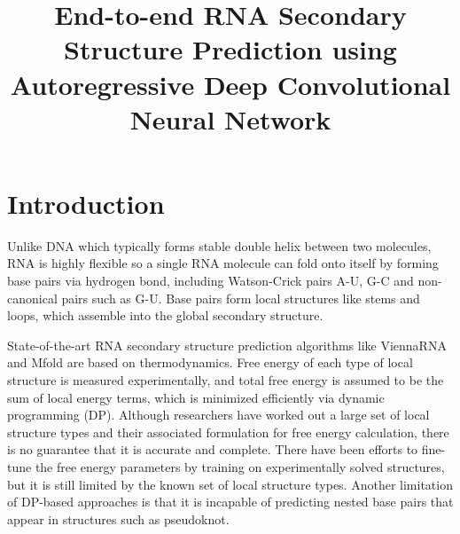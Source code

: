 \documentclass{article}
\title{End-to-end RNA Secondary Structure Prediction using Autoregressive Deep Convolutional Neural Network}
\begin{document}
\maketitle


\vspace*{-7em}

\section{Introduction}

Unlike DNA which typically forms stable double helix between two molecules, RNA is highly flexible
so a single RNA molecule can fold onto itself by
forming base pairs via hydrogen bond, including Watson-Crick pairs A-U,
G-C and non-canonical pairs such as G-U.
Base pairs form local structures like stems and loops,
which assemble into the global secondary structure.

State-of-the-art RNA secondary structure prediction algorithms
like ViennaRNA\cite{lorenz2011viennarna} and Mfold\cite{zuker2003mfold}
are based on thermodynamics.
Free energy of each type of local structure is measured experimentally,
and total free energy is assumed to be the sum of local energy terms,
which is minimized efficiently via dynamic programming (DP).
Although researchers have worked out a large set of local structure types and
their associated formulation for free energy calculation,
there is no guarantee that it is accurate and complete.
There have been efforts to fine-tune the free energy parameters by
training on experimentally solved structures\cite{andronescu2007efficient},
but it is still limited by the known set of local structure types.
Another limitation of DP-based approaches is that
it is incapable of predicting nested base pairs that appear in structures such as pseudoknot.


\end{document}
